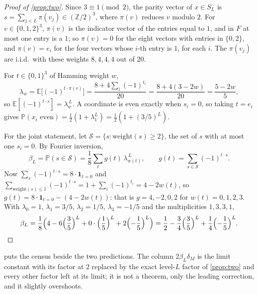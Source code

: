 \documentclass[11pt]{amsart}
\theoremstyle{definition}
\theoremstyle{remark}
\begin{document}
\begin{proof}[Proof of \cref{prop:two}]
Since $3\equiv1\pmod 2$, the parity vector of $x\in S_L$ is $s=\sum_{j<L}\pi(v_j)\in(\mathbb Z/2)^3$, where $\pi(v)$ reduces $v$ modulo $2$. For $v\in\{0,1,2\}^3$, $\pi(v)$ is the indicator vector of the entries equal to $1$, and in $F$ at most one entry is a $1$; so $\pi(v)=0$ for the eight vectors with entries in $\{0,2\}$, and $\pi(v)=e_i$ for the four vectors whose $i$-th entry is $1$, for each $i$. The $\pi(v_j)$ are i.i.d.\ with these weights $8,4,4,4$ out of $20$.

For $t\in\{0,1\}^3$ of Hamming weight $w$,
\[
\lambda_w=\mathbb E\bigl[(-1)^{t\cdot\pi(v)}\bigr]=\frac{8+4\sum_{i}(-1)^{t_i}}{20}=\frac{8+4(3-2w)}{20}=\frac{5-2w}{5},
\]
so $\mathbb E[(-1)^{t\cdot s}]=\lambda_{w}^{\,L}$. A coordinate is even exactly when $s_i=0$, so taking $t=e_i$ gives $\mathbb P(x_i\text{ even})=\frac12(1+\lambda_1^L)=\frac12(1+(3/5)^L)$.

For the joint statement, let $\mathcal S=\{s:\text{weight}(s)\ge2\}$, the set of $s$ with at most one $s_i=0$. By Fourier inversion,
\[
\beta_L=\mathbb P(s\in\mathcal S)=\frac18\sum_{t}g(t)\,\lambda_{w(t)}^{\,L},
\qquad
g(t)=\sum_{s\in\mathcal S}(-1)^{t\cdot s}.
\]
Now $\sum_{s}(-1)^{t\cdot s}=8\cdot\mathbf1_{t=0}$ and $\sum_{\text{weight}(s)\le1}(-1)^{t\cdot s}=1+\sum_i(-1)^{t_i}=4-2w(t)$, so $g(t)=8\cdot\mathbf1_{t=0}-(4-2w(t))$: that is $g=4,-2,0,2$ for $w(t)=0,1,2,3$. With $\lambda_0=1$, $\lambda_1=3/5$, $\lambda_2=1/5$, $\lambda_3=-1/5$ and the multiplicities $1,3,3,1$,
\[
\beta_L=\frac18\Bigl(4-6\Bigl(\frac35\Bigr)^{L}+0\cdot\Bigl(\frac15\Bigr)^{L}+2\Bigl(-\frac15\Bigr)^{L}\Bigr)
=\frac12-\frac34\Bigl(\frac35\Bigr)^{L}+\frac14\Bigl(-\frac15\Bigr)^{L}.\qedhere
\]
\end{proof}

 puts the census beside the two predictions. The column $2\beta_L\delta_M$ is the limit constant with its factor at $2$ replaced by the exact level-$L$ factor of \cref{prop:two} and every other factor left at its limit; it is not a theorem, only the leading correction, and it slightly overshoots.
\end{document}

